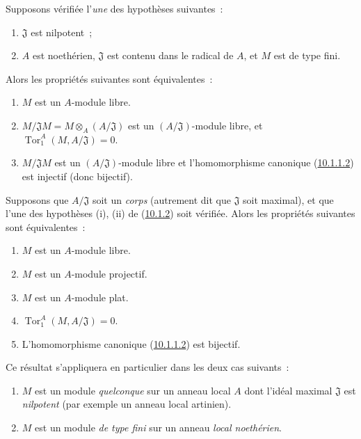 \begin{env}[10.1.2]
\label{0.10.1.2-fr}
Supposons vérifiée l'\emph{une} des hypothèses suivantes~:
\begin{enumerate}
  \item[(i)] $\mathfrak{J}$ est nilpotent~;
  \item[(ii)] $A$ est noethérien, $\mathfrak{J}$ est contenu dans le radical de
    $A$, et $M$ est de type fini.
\end{enumerate}
Alors les propriétés suivantes sont équivalentes~:
\begin{enumerate}
  \item[$a)$] $M$ est un $A$-module libre.
  \item[$b)$] $M/\mathfrak{J}M=M\otimes_A(A/\mathfrak{J})$ est un
    $(A/\mathfrak{J})$-module libre, et
    $\operatorname{Tor}_1^A(M,A/\mathfrak{J})=0$.
  \item[$c)$] $M/\mathfrak{J}M$ est un $(A/\mathfrak{J})$-module libre et
    l'homomorphisme canonique (\hyperref[0.10.1.1.2-fr]{10.1.1.2}) est
    injectif (donc bijectif).
\end{enumerate}
\end{env}

\begin{env}[10.1.3]
\label{0.10.1.3-fr}
Supposons que $A/\mathfrak{J}$ soit un \emph{corps} (autrement dit que
$\mathfrak{J}$ soit maximal), et que l'une des hypothèses (i), (ii) de
(\hyperref[0.10.1.2-fr]{10.1.2}) soit vérifiée. Alors les propriétés suivantes
sont équivalentes~:
\begin{enumerate}
  \item[$a)$] $M$ est un $A$-module libre.
  \item[$b)$] $M$ est un $A$-module projectif.
  \item[$c)$] $M$ est un $A$-module plat.
  \item[$d)$] $\operatorname{Tor}_1^A(M,A/\mathfrak{J})=0$.
  \item[$e)$] L'homomorphisme canonique
    (\hyperref[0.10.1.1.2-fr]{10.1.1.2}) est bijectif.
\end{enumerate}
Ce résultat s'appliquera en particulier dans les deux cas suivants~:
\begin{enumerate}
  \item[(i)] $M$ est un module \emph{quelconque} sur un anneau local $A$ dont
    l'idéal maximal $\mathfrak{J}$ est \emph{nilpotent} (par exemple un anneau
    local artinien).
  \item[(ii)] $M$ est un module \emph{de type fini} sur un anneau \emph{local
    noethérien}.
\end{enumerate}
\end{env}

